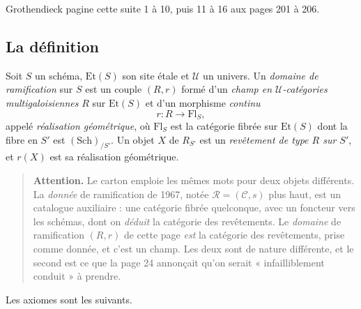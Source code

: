 \documentclass[11pt,a4paper]{article}
\begin{document}
Grothendieck pagine cette suite 1 à 10, puis 11 à 16 aux pages 201 à 206.

\subsection*{La définition}

Soit $S$ un schéma, $\mathrm{Et}(S)$ son site étale et $\mathcal{U}$ un
univers. Un \emph{domaine de ramification} sur $S$ est un couple $(R, r)$ formé
d'un \emph{champ en $\mathcal{U}$-catégories multigaloisiennes} $R$ sur
$\mathrm{Et}(S)$ et d'un morphisme \emph{continu}
\[
  r : R \longrightarrow \mathrm{Fl}_{S} ,
\]
appelé \emph{réalisation géométrique}, où $\mathrm{Fl}_{S}$ est la catégorie
fibrée sur $\mathrm{Et}(S)$ dont la fibre en $S'$ est $(\mathrm{Sch})_{/S'}$.
Un objet $X$ de $R_{S'}$ est un \emph{revêtement de type $R$ sur $S'$}, et
$r(X)$ est sa réalisation géométrique.

\begin{quote}
\textbf{Attention.} Le carton emploie les mêmes mots pour deux
objets différents. La \emph{donnée} de ramification de 1967, notée
$\mathcal{R} = (\mathcal{C}, s)$ plus haut, est un
catalogue auxiliaire : une catégorie fibrée quelconque, avec un foncteur vers
les schémas, dont on \emph{déduit} la catégorie des revêtements. Le
\emph{domaine} de ramification $(R, r)$ de cette page \emph{est} la catégorie
des revêtements, prise comme donnée, et c'est un champ. Les deux sont de
nature différente, et le second est ce que la page 24 annonçait qu'on serait
« infailliblement conduit » à prendre.
\end{quote}

Les axiomes sont les suivants.
\end{document}
